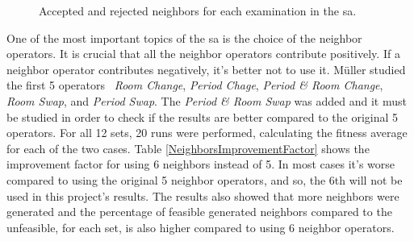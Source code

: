\begin{figure}[t!]
\centering

\caption{Accepted and rejected neighbors for each examination in the \gls{sa}.} 
\label{fig:AvsRNeighbors}

\end{figure}One of the most important topics of the \gls{sa} is the choice of the neighbor operators. It is crucial that all the neighbor operators contribute positively. If a neighbor operator contributes negatively, it's better not to use it. M\"{u}ller studied the first 5 operators~\cite{Mueller2009} \textit{Room Change}, \textit{Period Chage}, \textit{Period \& Room Change}, \textit{Room Swap}, and \textit{Period Swap}. The \textit{Period \& Room Swap} was added and it must be studied in order to check if the results are better compared to the original 5 operators. For all 12 sets, 20 runs were performed, calculating the fitness average for each of the two cases. Table \ref{NeighborsImprovementFactor} shows the improvement factor for using 6 neighbors instead of 5. In most cases it's worse compared to using the original 5 neighbor operators, and so, the 6th will not be used in this project's results. The results also showed that more neighbors were generated and the percentage of feasible generated neighbors compared to the unfeasible, for each set, is also higher compared to using 6 neighbor operators.

